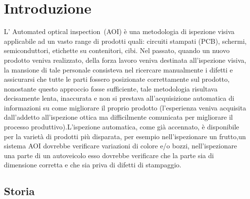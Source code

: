 \chapter{Introduzione}

L’ Automated optical inspection (AOI) è una metodologia di ispezione visiva applicabile ad un vasto range di prodotti quali: circuiti stampati (PCB), schermi, semiconduttori, etichette su contenitori, cibi. 
Nel passato, quando un nuovo prodotto veniva realizzato, della forza lavoro veniva destinata all’ispezione visiva, la mansione di tale personale consisteva nel ricercare manualmente i difetti e assicurarsi che tutte le parti fossero posizionate correttamente sul prodotto, nonostante questo approccio fosse sufficiente, tale metodologia risultava decisamente lenta, inaccurata e non si prestava all’acquisizione automatica di informazioni su come migliorare il proprio prodotto (l’esperienza veniva acquisita dall’addetto all’ispezione ottica ma difficilmente comunicata per migliorare il processo produttivo).L’ispezione automatica, come già accennato, è disponibile per la varietà di prodotti più disparata, per esempio nell’ispezionare un frutto,un sistema AOI dovrebbe verificare variazioni di colore e/o bozzi, nell’ispezionare una parte di un autoveicolo esso dovrebbe verificare che la parte sia di dimensione corretta e che sia priva di difetti di stampaggio.

\section{Storia}

